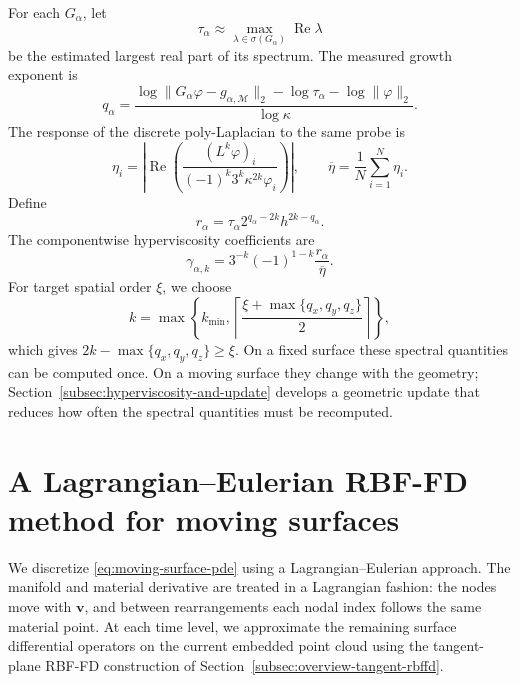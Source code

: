 \documentclass[a4paper,fleqn]{cas-sc}
\begin{document}
For each $G_\alpha$, let
\begin{equation}
  \tau_\alpha
  \approx
  \max_{\lambda\in\sigma(G_\alpha)}\operatorname{Re}\lambda
  \label{eq:hv-tau-definition}
\end{equation}
be the estimated largest real part of its spectrum.  The measured growth
exponent is
\begin{equation}
  q_\alpha
  =
  \frac{
    \log\|G_\alpha\varphi-g_{\alpha,\mathcal M}\|_2
    -\log\tau_\alpha-\log\|\varphi\|_2
  }{\log\kappa}.
  \label{eq:hv-growth-exponent}
\end{equation}
The response of the discrete poly-Laplacian to the same probe is
\begin{equation}
  \eta_i
  =
  \left|
    \operatorname{Re}
    \left(
      \frac{(L^k\varphi)_i}
      {(-1)^k3^k\kappa^{2k}\varphi_i}
    \right)
  \right|,
  \qquad
  \overline\eta=\frac1N\sum_{i=1}^N\eta_i.
  \label{eq:hv-poly-laplacian-response}
\end{equation}
Define
\begin{equation}
  r_\alpha
  =
  \tau_\alpha
  2^{q_\alpha-2k}
  h^{2k-q_\alpha}.
  \label{eq:raw-gamma-components}
\end{equation}
The componentwise hyperviscosity coefficients are
\begin{equation}
  \boxed{
  \gamma_{\alpha,k}
  =
  3^{-k}(-1)^{1-k}
  \frac{r_\alpha}{\overline\eta}.}
  \label{eq:gamma-full}
\end{equation}
For target spatial order $\xi$, we choose
\begin{equation}
  k
  =
  \max\left\{
    k_{\min},
    \left\lceil\frac{\xi+\max\{q_x,q_y,q_z\}}{2}\right\rceil
  \right\},
  \label{eq:hv-power}
\end{equation}
which gives $2k-\max\{q_x,q_y,q_z\}\geq\xi$.  On a fixed surface these spectral
quantities can be computed once.  On a moving surface they change with the
geometry; Section~\ref{subsec:hyperviscosity-and-update} develops a geometric
update that reduces how often the spectral quantities must be recomputed.


\section{A Lagrangian--Eulerian RBF-FD method for moving surfaces}
\label{sec:methods}
We discretize \eqref{eq:moving-surface-pde} using a Lagrangian--Eulerian
approach.  The manifold and material derivative are treated in a Lagrangian
fashion: the nodes move with $\bm v$, and between rearrangements each nodal
index follows the same material point.  At each time level, we approximate the
remaining surface differential operators on the current embedded point cloud
using the tangent-plane RBF-FD construction of
Section~\ref{subsec:overview-tangent-rbffd}.
\end{document}
